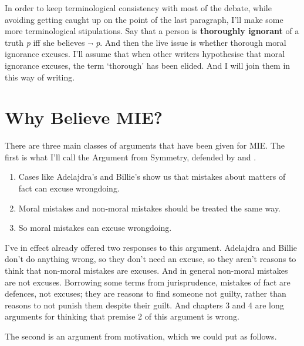 In order to keep terminological consistency with most of the debate, while avoiding getting caught up on the point of the last paragraph, I'll make some more terminological stipulations. Say that a person is \textbf{thoroughly ignorant} of a truth \emph{p} iff she believes $\neg$ \emph{p}. And then the live issue is whether thorough moral ignorance excuses. I'll assume that when other writers hypothesise that moral ignorance excuses, the term `thorough' has been elided. And I will join them in this way of writing.

\section{Why Believe MIE?}
\label{whybelievemie}

There are three main classes of arguments that have been given for MIE. The first is what I'll call the Argument from Symmetry, defended by \citet[64]{Rosen2003} and \citet[192]{Zimmerman2008}.

\begin{enumerate}
\item{} Cases like Adelajdra's and \gls{Billie}'s show us that mistakes about matters of fact can excuse wrongdoing.

\item{} Moral mistakes and non-moral mistakes should be treated the same way.

\item{} So moral mistakes can excuse wrongdoing.

\end{enumerate}
I've in effect already offered two responses to this argument. Adelajdra and \gls{Billie} don't do anything wrong, so they don't need an excuse, so they aren't reasons to think that non-moral mistakes are excuses. And in general non-moral mistakes are not excuses. Borrowing some terms from jurisprudence, mistakes of fact are defences, not excuses; they are reasons to find someone not guilty, rather than reasons to not punish them despite their guilt. And chapters 3 and 4 are long arguments for thinking that premise 2 of this argument is wrong.

The second is an argument from motivation, which we could put as follows.

